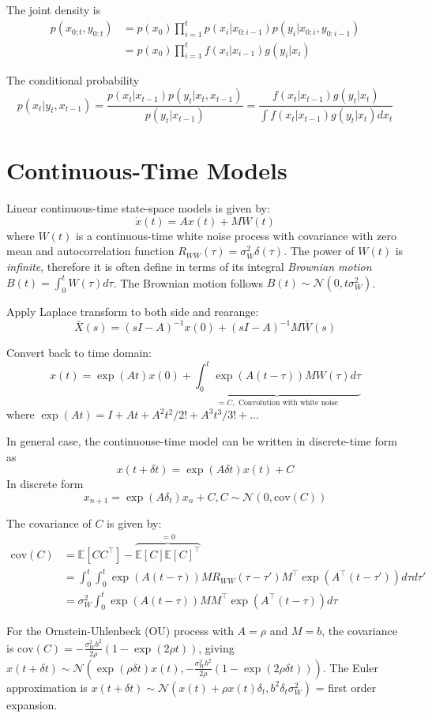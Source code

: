 \documentclass[12pt]{article}
\begin{document}
The joint density is
\begin{align*}
    p(x_{0:t}, y_{0:t}) &= p(x_0) \prod_{i=1}^{t} p(x_i | x_{0:i-1}) p(y_i | x_{0:i}, y_{0:i-1}) \\
    &= p(x_0) \prod_{i=1}^{t} f(x_i | x_{i-1}) g(y_i | x_i)
\end{align*}

The conditional probability
$$
p(x_t | y_t, x_{t-1}) = \frac{p(x_t | x_{t-1}) p(y_t | x_t, x_{t-1})}{p(y_t | x_{t-1})} = \frac{f(x_t | x_{t-1}) g(y_t | x_t)}{\int f(x_t | x_{t-1}) g(y_t | x_t) dx_t}
$$

\section{Continuous-Time Models}
Linear continuous-time state-space models is given by:
$$
\dot{x}(t) = A x(t) + MW(t)
$$
where $W(t)$ is a continuous-time white noise process with covariance with zero mean and autocorrelation function $R_{WW}(\tau) = \sigma_W^2\delta(\tau)$. The power of $W(t)$ is \textit{infinite}, therefore it is often define in terms of its integral \textit{Brownian motion} $B(t) = \int_{0}^{t}W(\tau)d\tau$.
The Brownian motion follows $B(t) \sim \mathcal{N}(0, t \sigma_W^2)$.

Apply Laplace transform to both side and rearange:
$$
\bar{X}(s) = (sI - A)^{-1} x(0) + (sI - A)^{-1} M \bar{W}(s)
$$

Convert back to time domain:
$$
x(t) = \exp (At) x(0) + \underbrace{\int_0^t \exp({A(t-\tau)}) M W(\tau) d\tau}_{= C, \text{ Convolution with white noise}}
$$
where $\exp(At) = I + At + A^2t^2/2! + A^3t^3/3! + \dots$

In general case, the continuouse-time model can be written in discrete-time form as
$$
x(t + \delta t) = \exp(A\delta t) x(t) + C
$$
In discrete form
$$
x_{n+1} = \exp(A \delta_t)x_n + C, C \sim \mathcal{N}(0, \text{cov}(C))
$$

The covariance of $C$ is given by:
\begin{align*}
    \text{cov}(C) &= \mathbb{E}[C C^\top]  - \overbrace{\mathbb{E}[C] \mathbb{E}[C]^\top}^{=0}\\
    &= \int_0^t \int_0^t \exp(A(t-\tau)) M R_{WW}(\tau - \tau') M^\top \exp(A^\top (t-\tau')) d\tau d\tau' \\
    &= \sigma_W^2 \int_0^t \exp(A(t-\tau)) M M^\top \exp(A^\top (t-\tau)) d\tau
\end{align*}

For the Ornstein-Uhlenbeck (OU) process with $A = \rho$ and $M = b$,
the covariance is $\text{cov}(C) = -\frac{\sigma_W^2 b^2}{2\rho}(1 - \exp(2\rho t))$, 
giving $x(t + \delta t) \sim \mathcal{N}\left(\exp(\rho\delta t) x(t), -\frac{\sigma_W^2 b^2}{2\rho}(1 - \exp(2\rho \delta t))\right)$.
The Euler approximation is $x(t + \delta t) \sim \mathcal{N}(x(t)+\rho x(t)\delta_t, b^2 \delta_t \sigma_W^2)$ = first order expansion.
\end{document}
